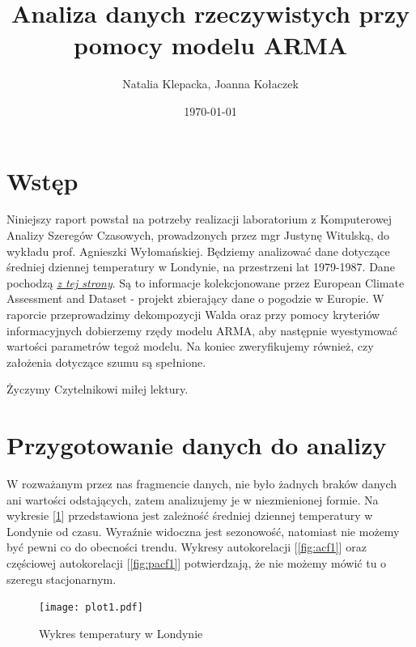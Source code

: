 \documentclass{article}
\title{Analiza danych rzeczywistych przy pomocy modelu ARMA}
\author{Natalia Klepacka, Joanna Kołaczek}
\date{\today}
\theoremstyle{break}
\begin{document}
	\maketitle
	\tableofcontents
	\clearpage
	\section{Wstęp}
	Niniejszy raport powstał na potrzeby realizacji laboratorium z Komputerowej Analizy Szeregów Czasowych, prowadzonych przez mgr Justynę Witulską, do wykładu prof. Agnieszki Wyłomańskiej.
	Będziemy analizować dane dotyczące średniej dziennej temperatury w Londynie, na przestrzeni lat 1979-1987. Dane pochodzą \href{https://www.kaggle.com/datasets/emmanuelfwerr/london-weather-data }{\textit{z tej strony}}. Są to informacje kolekcjonowane przez European Climate Assessment and Dataset - projekt zbierający dane o pogodzie w Europie.
	W raporcie przeprowadzimy dekompozycji Walda oraz przy pomocy kryteriów informacyjnych dobierzemy rzędy modelu ARMA, aby następnie wyestymować wartości parametrów tegoż modelu. Na koniec zweryfikujemy również, czy założenia dotyczące szumu są spełnione.
	
	Życzymy Czytelnikowi miłej lektury.
	
	\section{Przygotowanie danych do analizy}
	W rozważanym przez nas fragmencie danych, nie było żadnych braków danych ani wartości odstających, zatem analizujemy je w niezmienionej formie. Na wykresie [\ref{fig:p1}] przedstawiona jest zależność średniej dziennej temperatury w Londynie od czasu. Wyraźnie widoczna jest sezonowość, natomiast nie możemy być pewni co do obecności trendu. Wykresy autokorelacji [\ref{fig:acf1}] oraz częściowej autokorelacji [\ref{fig:pacf1}] potwierdzają, że nie możemy mówić tu o szeregu stacjonarnym.
	
	\begin{figure}[H]
		\begin{center}
			\texttt{[image: plot1.pdf]}
			\caption{Wykres temperatury w Londynie}
			\label{fig:p1}
		\end{center}
	\end{figure}
	
\end{document}
